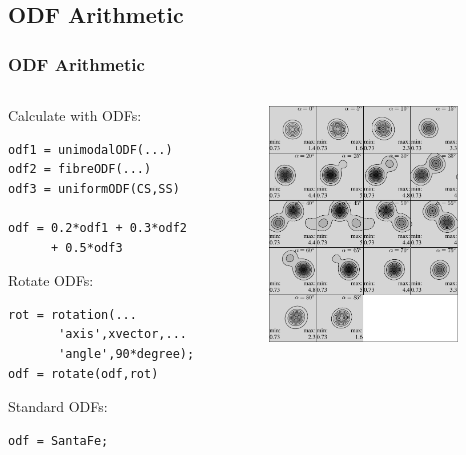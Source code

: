 \subsection*{ODF Arithmetic}

\begin{frame}[fragile]
  \frametitle{ODF Arithmetic}


  \begin{columns}
    \begin{column}{6cm}

      Calculate with ODFs:
\begin{lstlisting}
odf1 = unimodalODF(...)
odf2 = fibreODF(...)
odf3 = uniformODF(CS,SS)

odf = 0.2*odf1 + 0.3*odf2
      + 0.5*odf3

\end{lstlisting}

  Rotate ODFs:
\begin{lstlisting}
rot = rotation(...
       'axis',xvector,...
       'angle',90*degree);
odf = rotate(odf,rot)
\end{lstlisting}


  Standard ODFs:
\begin{lstlisting}
odf = SantaFe;
\end{lstlisting}


\end{column}
\begin{column}{5cm}
  \includegraphics[width=5cm]{pic/santafeeh}
\end{column}
\end{columns}

\end{frame}


